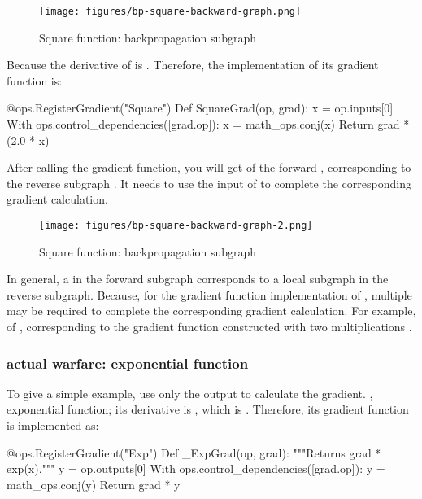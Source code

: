 \begin{content}
\begin{figure}[!htbp]
\centering
\texttt{[image: figures/bp-square-backward-graph.png]}
\caption{Square function: backpropagation subgraph}
 \label{fig:bp-square-backward-graph}
\end{figure}

Because the derivative of  is . Therefore, the implementation of its gradient function  is:

\begin{leftbar}
\begin{python}
@ops.RegisterGradient("Square")
Def SquareGrad(op, grad):
  x = op.inputs[0]
  With ops.control_dependencies([grad.op]):
    x = math_ops.conj(x)
    Return grad * (2.0 * x)
\end{python}
\end{leftbar}

After calling the gradient function, you will get  of the forward , corresponding to the reverse subgraph . It needs to use the input of  to complete the corresponding gradient calculation.

\begin{figure}[!h]
\centering
\texttt{[image: figures/bp-square-backward-graph-2.png]}
\caption{Square function: backpropagation subgraph}
 \label{fig:bp-square-backward-graph-2}
\end{figure}

In general, a  in the forward subgraph corresponds to a local subgraph in the reverse subgraph. Because, for the gradient function implementation of , multiple  may be required to complete the corresponding gradient calculation. For example,  of , corresponding to the gradient function constructed with two  multiplications .

\subsubsection{actual warfare: exponential function}

To give a simple example, use only the output to calculate the gradient. , exponential function; its derivative is , which is . Therefore, its gradient function is implemented as:

\begin{leftbar}
\begin{python}
@ops.RegisterGradient("Exp")
Def _ExpGrad(op, grad):
  """Returns grad * exp(x)."""
  y = op.outputs[0]
  With ops.control_dependencies([grad.op]):
    y = math_ops.conj(y)
    Return grad * y
\end{python}
\end{leftbar}


\end{content}
